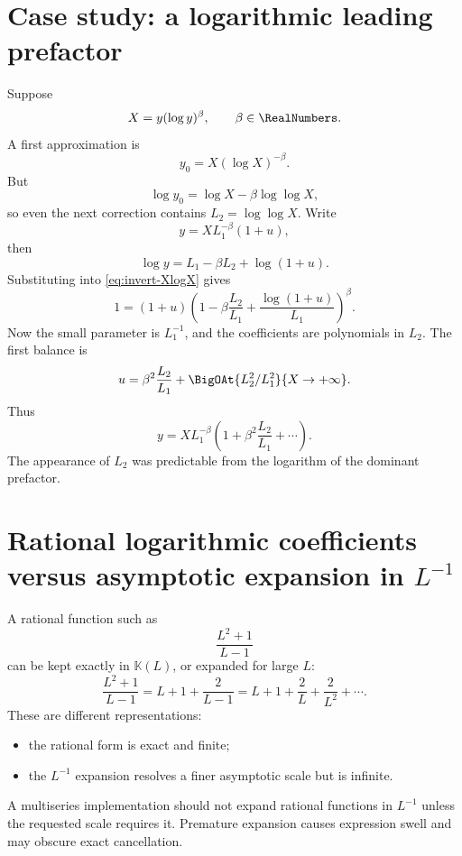 \documentclass[11pt,openany]{book}
\theoremstyle{definition}
\theoremstyle{plain}
\theoremstyle{remark}
\newcommand{\K}{\mathbb{K}}
\begin{document}
\section{Case study: a logarithmic leading prefactor}
Suppose
\begin{equation}\label{eq:invert-XlogX}
 X=y(\log y)^\beta,
 \qquad \beta\in\RealNumbers.
\end{equation}
A first approximation is
\[
 y_0=X(\log X)^{-\beta}.
\]
But
\[
 \log y_0=\log X-\beta\log\log X,
\]
so even the next correction contains \(L_2=\log\log X\).  Write
\[
 y=X L_1^{-\beta}(1+u),
\]
then
\[
 \log y=L_1-\beta L_2+\log(1+u).
\]
Substituting into \cref{eq:invert-XlogX} gives
\begin{equation}\label{eq:ulog-equation}
 1=(1+u)\left(
 1-\beta\frac{L_2}{L_1}
 +\frac{\log(1+u)}{L_1}
 \right)^\beta.
\end{equation}
Now the small parameter is \(L_1^{-1}\), and the coefficients are polynomials
in \(L_2\).  The first balance is
\begin{equation}\label{eq:u-first-logprefactor}
 u=\beta^2\frac{L_2}{L_1}
 +\BigOAt{L_2^2/L_1^2}{X\to+\infty}.
\end{equation}
Thus
\begin{equation}\label{eq:invert-XlogX-first}
 y=X L_1^{-\beta}
 \left(1+\beta^2\frac{L_2}{L_1}+\cdots\right).
\end{equation}
The appearance of \(L_2\) was predictable from the logarithm of the dominant
prefactor.

\section{Rational logarithmic coefficients versus asymptotic expansion in \texorpdfstring{\(L^{-1}\)}{L inverse}}
A rational function such as
\[
 \frac{L^2+1}{L-1}
\]
can be kept exactly in \(\K(L)\), or expanded for large \(L\):
\[
 \frac{L^2+1}{L-1}
 =L+1+\frac2{L-1}
 =L+1+\frac2L+\frac2{L^2}+\cdots.
\]
These are different representations:
\begin{itemize}
\item the rational form is exact and finite;
\item the \(L^{-1}\) expansion resolves a finer asymptotic scale but is
      infinite.
\end{itemize}
A multiseries implementation should not expand rational functions in \(L^{-1}\)
unless the requested scale requires it.  Premature expansion causes expression
swell and may obscure exact cancellation.
\end{document}
